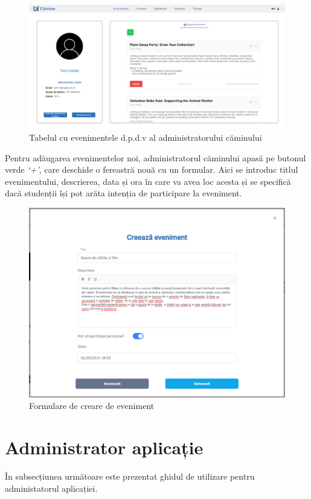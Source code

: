 \documentclass[12pt,a4paper]{report}
\theoremstyle{definition}
\theoremstyle{remark}
\begin{document}
\begin{figure}[H]
    \centering
    \includegraphics[width=0.8\linewidth]{resurse/ghid_utilizare/eveneimente_administare.png}
    \caption{Tabelul cu evenimentele d.p.d.v al administratorului căminului}
\end{figure}

\par Pentru adăugarea evenimentelor noi, administratorul căminului apasă pe butonul verde \textit{`+'}, care deschide o fereastră nouă cu un formular. Aici se introduc titlul evenimentului, descrierea, data și ora în care va avea loc acesta și se specifică dacă studenții își pot arăta intenția de participare la eveniment.

\begin{figure}[H]
    \centering
    \includegraphics[width=0.8\linewidth]{resurse/ghid_utilizare/creare_evenimente.png}
    \caption{Formulare de creare de eveniment}
\end{figure}

\section{Administrator aplicație}
În subsecțiunea următoare este prezentat ghidul de utilizare pentru administatorul aplicației.
\end{document}
